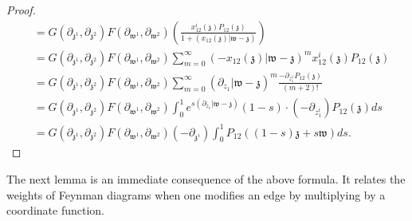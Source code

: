 \documentclass[11pt]{amsart}
\theoremstyle{definition}
\theoremstyle{remark}
\numberwithin{equation}{section}
\begin{document}
\begin{proof}
\begin{align*}
     & =G(\partial_{\mathfrak{z}^1},\partial_{\mathfrak{z}^2})F(\partial_{\mathfrak{w}^1},\partial_{\mathfrak{w}^2})\left(\frac{x^i_{12}(\mathfrak{z})P_{12}(\mathfrak{z})}{1+(x_{12}(\mathfrak{z})|\mathfrak{w}-\mathfrak{z})}\right)\\
    &=  G(\partial_{\mathfrak{z}^1},\partial_{\mathfrak{z}^2})F(\partial_{\mathfrak{w}^1},\partial_{\mathfrak{w}^2})  \sum_{m=0}^{\infty}(-x_{12}(\mathfrak{z})|\mathfrak{w}-\mathfrak{z})^mx^i_{12}(\mathfrak{z})P_{12}(\mathfrak{z}) \\
    &=G(\partial_{\mathfrak{z}^1},\partial_{\mathfrak{z}^2})F(\partial_{\mathfrak{w}^1},\partial_{\mathfrak{w}^2}) \sum_{m=0}^{\infty}(\partial_{z_1}|\mathfrak{w}-\mathfrak{z})^m\frac{-\partial_{z^1_1}P_{12}(\mathfrak{z})}{(m+2)!}\\
    &=G(\partial_{\mathfrak{z}^1},\partial_{\mathfrak{z}^2})F(\partial_{\mathfrak{w}^1},\partial_{\mathfrak{w}^2}) \int^1_0e^{s(\partial_{z_1}|\mathfrak{w}-\mathfrak{z})}(1-s)\cdot (-\partial_{z^{i}_1})P_{12}(\mathfrak{z})ds\\
    &=G(\partial_{\mathfrak{z}^1},\partial_{\mathfrak{z}^2})F(\partial_{\mathfrak{w}^1},\partial_{\mathfrak{w}^2})(-\partial_{\mathfrak{z}^i})\int^1_0P_{12}\left((1-s)\mathfrak{z}+s\mathfrak{w}\right)ds.
  \end{align*}
  \fi
\end{proof}

The next lemma is an immediate consequence of the above formula.
It relates the weights of Feynman diagrams when one modifies an edge by multiplying by a coordinate function.
\end{document}
